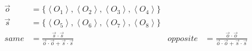 \documentclass[preview, border={5pt,5pt,5pt,5pt}]{standalone}
\newcommand{\ev}[1]{\left\langle #1 \right\rangle}
\begin{document}
$
\begin{aligned}
    \vec{o} &=\{\ev{O_1},\ev{O_2},\ev{O_3},\ev{O_4}\} \\
    \vec{s} &=\{\ev{O_5},\ev{O_6},\ev{O_7},\ev{O_8}\} \\
    same &= \frac{ \vec{s} \cdot \vec{s}}{ \vec{o} \cdot \vec{o} +  \vec{s} \cdot \vec{s}} & opposite &= \frac{ \vec{o} \cdot \vec{o}}{ \vec{o} \cdot \vec{o} +  \vec{s} \cdot \vec{s}}
\end{aligned}
$
\end{document}
